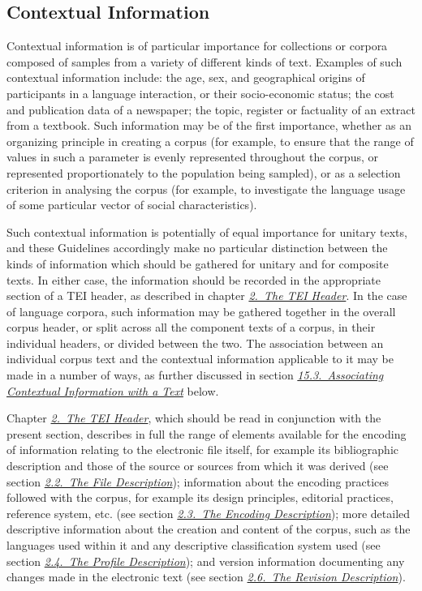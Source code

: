 \subsection[{Contextual Information}]{Contextual Information}\label{CCAH}\par
Contextual information is of particular importance for collections or corpora composed of samples from a variety of different kinds of text. Examples of such contextual information include: the age, sex, and geographical origins of participants in a language interaction, or their socio-economic status; the cost and publication data of a newspaper; the topic, register or factuality of an extract from a textbook. Such information may be of the first importance, whether as an organizing principle in creating a corpus (for example, to ensure that the range of values in such a parameter is evenly represented throughout the corpus, or represented proportionately to the population being sampled), or as a selection criterion in analysing the corpus (for example, to investigate the language usage of some particular vector of social characteristics).\par
Such contextual information is potentially of equal importance for unitary texts, and these Guidelines accordingly make no particular distinction between the kinds of information which should be gathered for unitary and for composite texts. In either case, the information should be recorded in the appropriate section of a TEI header, as described in chapter \textit{\hyperref[HD]{2.\ The TEI Header}}. In the case of language corpora, such information may be gathered together in the overall corpus header, or split across all the component texts of a corpus, in their individual headers, or divided between the two. The association between an individual corpus text and the contextual information applicable to it may be made in a number of ways, as further discussed in section \textit{\hyperref[CCAS]{15.3.\ Associating Contextual Information with a Text}} below.\par
Chapter \textit{\hyperref[HD]{2.\ The TEI Header}}, which should be read in conjunction with the present section, describes in full the range of elements available for the encoding of information relating to the electronic file itself, for example its bibliographic description and those of the source or sources from which it was derived (see section \textit{\hyperref[HD2]{2.2.\ The File Description}}); information about the encoding practices followed with the corpus, for example its design principles, editorial practices, reference system, etc. (see section \textit{\hyperref[HD5]{2.3.\ The Encoding Description}}); more detailed descriptive information about the creation and content of the corpus, such as the languages used within it and any descriptive classification system used (see section \textit{\hyperref[HD4]{2.4.\ The Profile Description}}); and version information documenting any changes made in the electronic text (see section \textit{\hyperref[HD6]{2.6.\ The Revision Description}}).\par
